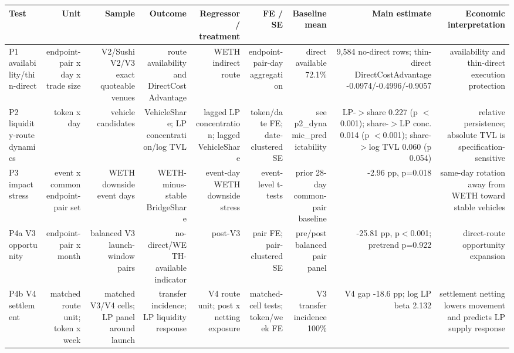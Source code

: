 \begin{tabular}{lrrrrrrrr}
\toprule
Test & Unit & Sample & Outcome & Regressor / treatment & FE / SE & Baseline mean & Main estimate & Economic interpretation \\
\midrule
P1 availability/thin-direct & endpoint-pair x day x trade size & V2/Sushi V2/V3 exact quoteable venues & route availability and DirectCostAdvantage & WETH indirect route & endpoint-pair-day aggregation & direct available 72.1\% & 9,584 no-direct rows; thin-direct DirectCostAdvantage -0.0974/-0.4996/-0.9057 & availability and thin-direct execution protection \\
P2 liquidity-route dynamics & token x day & vehicle candidates & VehicleShare; LP concentration/log TVL & lagged LP concentration; lagged VehicleShare & token/date FE; date-clustered SE & see p2\_dynamic\_predictability & LP-\ensuremath{>}share 0.227 (p \ensuremath{<}0.001); share-\ensuremath{>}LP conc. 0.014 (p \ensuremath{<}0.001); share-\ensuremath{>}log TVL 0.060 (p 0.054) & relative persistence; absolute TVL is specification-sensitive \\
P3 impact stress & event x common endpoint-pair set & WETH downside event days & WETH-minus-stable BridgeShare & event-day WETH downside stress & event-level t-tests & prior 28-day common-pair baseline & -2.96 pp, p=0.018 & same-day rotation away from WETH toward stable vehicles \\
P4a V3 opportunity & endpoint-pair x month & balanced V3 launch-window pairs & no-direct/WETH-available indicator & post-V3 & pair FE; pair-clustered SE & pre/post balanced pair panel & -25.81 pp, p\ensuremath{<}0.001; pretrend p=0.922 & direct-route opportunity expansion \\
P4b V4 settlement & matched route unit; token x week & matched V3/V4 cells; LP panel around launch & transfer incidence; LP liquidity response & V4 route unit; post x netting exposure & matched-cell tests; token/week FE & V3 transfer incidence 100\% & V4 gap -18.6 pp; log LP beta 2.132 & settlement netting lowers movement and predicts LP supply response \\
\bottomrule
\end{tabular}
